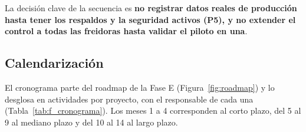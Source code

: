 La decisión clave de la secuencia es \textbf{no registrar datos reales de producción hasta tener los respaldos y la seguridad activos (P5), y no extender el control a todas las freidoras hasta validar el piloto en una}.

\subsection{Calendarización}

El cronograma parte del roadmap de la Fase E (Figura~\ref{fig:roadmap}) y lo desglosa en actividades por proyecto, con el responsable de cada una (Tabla~\ref{tab:f_cronograma}). Los meses 1 a 4 corresponden al corto plazo, del 5 al 9 al mediano plazo y del 10 al 14 al largo plazo.

